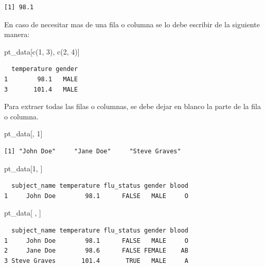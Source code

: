 \documentclass[
  letterpaper,
  DIV=11,
  numbers=noendperiod]{scrartcl}
\newenvironment{Shaded}{\begin{snugshade}}{\end{snugshade}}
\newcommand{\DecValTok}[1]{\textcolor[rgb]{0.68,0.00,0.00}{#1}}
\newcommand{\FunctionTok}[1]{\textcolor[rgb]{0.28,0.35,0.67}{#1}}
\newcommand{\NormalTok}[1]{\textcolor[rgb]{0.00,0.23,0.31}{#1}}
\begin{document}
\begin{verbatim}
[1] 98.1
\end{verbatim}

En caso de necesitar mas de una fila o columna se lo debe escribir de la
siguiente manera:

\begin{Shaded}
\begin{Highlighting}[]
\NormalTok{ pt\_data[}\FunctionTok{c}\NormalTok{(}\DecValTok{1}\NormalTok{, }\DecValTok{3}\NormalTok{), }\FunctionTok{c}\NormalTok{(}\DecValTok{2}\NormalTok{, }\DecValTok{4}\NormalTok{)]}
\end{Highlighting}
\end{Shaded}

\begin{verbatim}
  temperature gender
1        98.1   MALE
3       101.4   MALE
\end{verbatim}

Para extraer todas las filas o columnas, se debe dejar en blanco la
parte de la fila o columna.

\begin{Shaded}
\begin{Highlighting}[]
\NormalTok{pt\_data[, }\DecValTok{1}\NormalTok{]}
\end{Highlighting}
\end{Shaded}

\begin{verbatim}
[1] "John Doe"     "Jane Doe"     "Steve Graves"
\end{verbatim}

\begin{Shaded}
\begin{Highlighting}[]
\NormalTok{pt\_data[}\DecValTok{1}\NormalTok{, ]}
\end{Highlighting}
\end{Shaded}

\begin{verbatim}
  subject_name temperature flu_status gender blood
1     John Doe        98.1      FALSE   MALE     O
\end{verbatim}

\begin{Shaded}
\begin{Highlighting}[]
\NormalTok{pt\_data[ , ]}
\end{Highlighting}
\end{Shaded}

\begin{verbatim}
  subject_name temperature flu_status gender blood
1     John Doe        98.1      FALSE   MALE     O
2     Jane Doe        98.6      FALSE FEMALE    AB
3 Steve Graves       101.4       TRUE   MALE     A
\end{verbatim}
\end{document}
